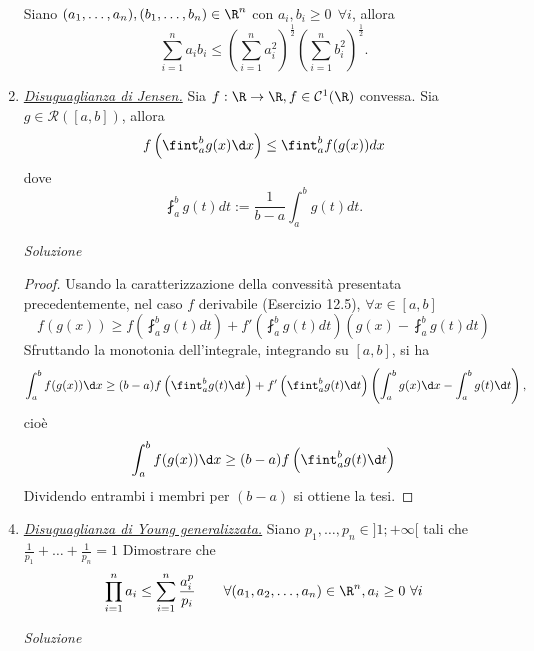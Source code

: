 \documentclass{article}
\begin{document}
\begin{enumerate}[label=\textbf{Esercizio 12.\arabic*.},itemindent=*]
\begin{corollary*}
    Siano $(a_1, \dots, a_n), (b_1,\dots, b_n)\in \R^n$ con $a_i, b_i\geq 0~~\forall i$, allora  
    \[\sum_{i=1}^n a_ib_i\leq \left(\sum_{i=1}^na_i^2\right)^{\frac{1}{2}}\left(\sum_{i=1}^nb_i^2\right)^{\frac{1}{2}}.\]
\end{corollary*}

\item \underline{\textit{Disuguaglianza di Jensen.}} Sia $f:\R\to\R, f\in \mathcal{C}^1(\R)$ convessa. Sia $g\in \mathcal{R}([a,b])$, allora 
\[f\left( \fint_a^b g(x)\d x \right)\leq \fint _a^bf(g(x))dx\] 
dove
\[\fint_a^bg(t)dt:=\frac{1}{b-a}\int _a^bg(t)dt.\]

\item[\textit{\large Soluzione~}]~

\begin{proof}
   Usando la caratterizzazione della convessità presentata precedentemente, nel caso $f$ derivabile (Esercizio 12.5), $\forall x\in [a,b]$
   \[f(g(x))\geq f\left(\fint_a^bg(t)dt\right)+f'\left(\fint_a^bg(t)dt\right)\left( g(x)-\fint _a^bg(t)dt \right)\]
   Sfruttando la monotonia dell'integrale, integrando su $[a,b]$, si ha
   \[\int_a^bf(g(x))\d x\geq (b - a)f\left( \fint_a^bg(t)\d t \right) + f'\left( \fint_a^bg(t)\d t \right) \left( \int_a^bg(x)\d x -  \int_a^bg(t)\d t\right), \]
   cioè 
   \[\int_a^bf(g(x))\d x\geq (b - a)f\left(\fint_a^bg(t)\d t\right)\]
   Dividendo entrambi i membri per $(b-a)$ si ottiene la tesi.
\end{proof}

\item \underline{\textit{Disuguaglianza di Young generalizzata.}} Siano $p_1, \dots, p_n \in ]1;+\infty[$ tali che $\frac{1}{p_1}+\dots+\frac{1}{p_n}=1$ Dimostrare che 
\[\prod_{i=1}^na_i\leq \sum_{i=1}^n\frac{a_i^p}{p_i}\qquad \forall (a_1, a_2, \dots, a_n)\in \R^n, a_i\geq 0~\forall i\]

\item[\textit{\large Soluzione~}]~


\end{enumerate}
\end{document}
